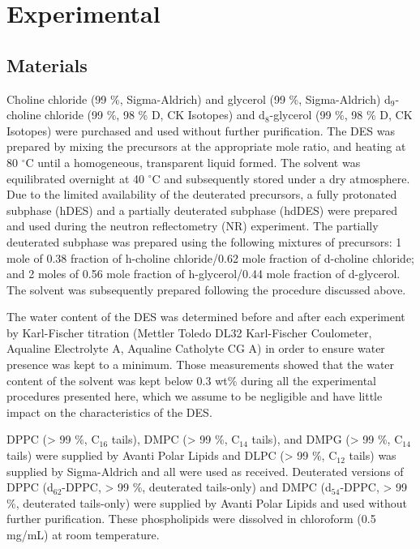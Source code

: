 \documentclass[twoside,twocolumn,9pt]{article}
\begin{document}
\section{Experimental}

\subsection{Materials}
Choline chloride (99 \%, Sigma-Aldrich) and glycerol (99 \%, Sigma-Aldrich) d$_9$-choline chloride (99 \%, 98 \% D, CK Isotopes) and d$_8$-glycerol (99 \%, 98 \% D, CK Isotopes)  were purchased and used without further purification. The DES was prepared by mixing the precursors at the appropriate mole ratio, and heating at 80 $^\circ$C until a homogeneous, transparent liquid formed.\cite{Smith2014} The solvent was equilibrated overnight at 40 $^\circ$C and subsequently stored under a dry atmosphere. Due to the limited availability of the deuterated precursors, a fully protonated subphase (hDES) and a partially deuterated subphase (hdDES) were prepared and used during the neutron reflectometry (NR) experiment. The partially deuterated subphase was prepared using the following mixtures of precursors: 1 mole of 0.38 fraction of h-choline chloride/0.62 mole fraction of d-choline chloride; and 2 moles of 0.56 mole fraction of h-glycerol/0.44 mole fraction of d-glycerol. The solvent was subsequently prepared following the procedure discussed above. 

The water content of the DES was determined before and after each experiment by Karl-Fischer titration (Mettler Toledo DL32 Karl-Fischer Coulometer, Aqualine Electrolyte A, Aqualine Catholyte CG A) in order to ensure water presence was kept to a minimum. Those measurements showed that the water content of the solvent was kept below 0.3 wt\% during all the experimental procedures presented here, which we assume to be negligible and have little impact on the characteristics of the DES.\cite{Hammond2016,Hammond2017}

DPPC (> 99 \%, C$_{16}$ tails), DMPC (> 99 \%, C$_{14}$ tails), and DMPG (> 99 \%, C$_{14}$ tails) were supplied by Avanti Polar Lipids and DLPC (> 99 \%, C$_{12}$ tails) was supplied by Sigma-Aldrich and all were used as received. Deuterated versions of DPPC (d$_{62}$-DPPC, > 99 \%, deuterated tails-only) and DMPC (d$_{54}$-DPPC, > 99 \%, deuterated tails-only) were supplied by Avanti Polar Lipids and used without further purification. These phospholipids were dissolved in chloroform (0.5 mg/mL) at room temperature. 
\end{document}
